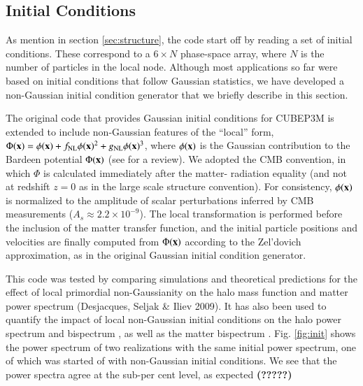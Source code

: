 \subsection{Initial Conditions}
\label{subsec:init}

As mention in section \ref{sec:structure}, the code start off by reading a set of initial conditions.
These correspond to a  $6 \times N$ phase-space array, where $N$ is the number of particles in the
local node. Although most applications so far were based on initial conditions that follow Gaussian statistics,
we have developed a non-Gaussian initial condition generator that we briefly describe in this section. 


The original code that provides Gaussian initial conditions for {\small CUBEP3M} 
is extended to include non-Gaussian features of the ``local'' form,
$\Phi({\bf x})=\phi({\bf x})+f_{\rm NL} \phi({\bf x})^2 + g_{\rm NL} 
\phi({\bf x})^3$, where $\phi({\bf x})$ is the Gaussian contribution
to the Bardeen potential $\Phi({\bf x})$ (see \cite{2004PhR...402..103B} for a review). 
We adopted the CMB convention,
in which $\Phi$ is calculated immediately after the matter-
radiation equality (and not at redshift $z=0$ as in the large scale
structure convention). For consistency, $\phi({\bf x})$ is normalized
to the amplitude of scalar perturbations inferred by CMB measurements
($A_s\approx 2.2 \times 10^{-9}$). The local transformation is performed 
before the inclusion of the matter transfer function, and the initial 
particle positions and velocities are finally computed from $\Phi({\bf x})$ 
according to the Zel'dovich approximation, as in the original Gaussian initial condition generator.

This code was tested by comparing simulations and theoretical predictions
for the effect of local primordial non-Gaussianity on the halo mass 
function and matter power spectrum (Desjacques, Seljak \& Iliev 2009). 
It has also been used to quantify the impact of local non-Gaussian initial
conditions on the halo power spectrum \citep{2009MNRAS.396...85D,
2010PhRvD..81b3006D} and bispectrum \citep{2010MNRAS.406.1014S},
 as well as the matter bispectrum \citep{2011arXiv1111.6966S}.
Fig. \ref{fig:init} shows the power spectrum of two realizations with the same initial power spectrum, 
one of which was started of with non-Gaussian initial conditions.
We see that the power spectra agree at the sub-per cent level, as expected {\bf (?????)}

